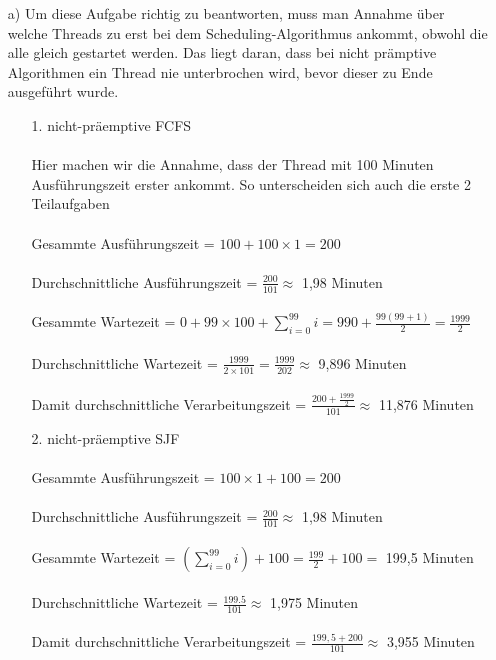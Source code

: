 \begin{enumerate}
    
\item[a)]
Um diese Aufgabe richtig zu beantworten, muss man Annahme über welche Threads zu erst bei dem Scheduling-Algorithmus ankommt, obwohl die alle gleich gestartet werden. Das liegt daran, dass bei nicht prämptive Algorithmen ein Thread nie unterbrochen wird, bevor dieser zu Ende ausgeführt wurde.

\begin{enumerate}

\item[1. ] nicht-präemptive FCFS \\ \\
Hier machen wir die Annahme, dass der Thread mit 100 Minuten Ausführungszeit erster ankommt. So unterscheiden sich auch die erste 2 Teilaufgaben \\ \\
Gesammte Ausführungszeit = $100 + 100 \times 1 = 200$ \\ \\
Durchschnittliche Ausführungszeit = $ \frac{200}{101} \approx $ 1,98 Minuten \\ \\
Gesammte Wartezeit = $0 + 99 \times 100 + \sum_{i=0}^{99} i = 990 + \frac{99(99+1)}{2} = \frac{1999}{2}$ \\ \\
Durchschnittliche Wartezeit = $\frac{1999}{2 \times 101} = \frac{1999}{202} \approx $ 9,896 Minuten \\ \\
Damit durchschnittliche Verarbeitungszeit = $\frac{200 + \frac{1999}{2}}{101} \approx $ 11,876 Minuten \\

\item[2. ] nicht-präemptive SJF \\ \\
Gesammte Ausführungszeit = $100 \times 1 + 100 = 200$ \\ \\
Durchschnittliche Ausführungszeit = $ \frac{200}{101} \approx $ 1,98 Minuten \\ \\
Gesammte Wartezeit = $(\sum_{i=0}^{99} i) + 100 = \frac{199}{2} + 100 =  $ 199,5 Minuten \\ \\
Durchschnittliche Wartezeit = $\frac{199.5}{101} \approx $ 1,975 Minuten \\ \\
Damit durchschnittliche Verarbeitungszeit = $\frac{199,5 + 200}{101} \approx $ 3,955 Minuten \\


\end{enumerate}
\end{enumerate}
